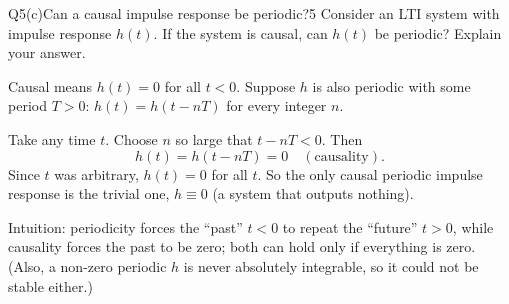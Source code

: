 \begin{qcard}{Q5(c)}{Can a causal impulse response be periodic?}{5}
Consider an LTI system with impulse response $h(t)$. If the system is causal, can $h(t)$ be periodic? Explain your answer.
\end{qcard}
\begin{solution}
Causal means $h(t)=0$ for all $t<0$. Suppose $h$ is also periodic with some period $T>0$: $h(t)=h(t-nT)$ for every integer $n$.

Take any time $t$. Choose $n$ so large that $t-nT<0$. Then
\[h(t)=h(t-nT)=0\quad(\text{causality}).\]
Since $t$ was arbitrary, $h(t)=0$ for all $t$. So the only causal periodic impulse response is the trivial one, $h\equiv0$ (a system that outputs nothing).

Intuition: periodicity forces the ``past'' $t<0$ to repeat the ``future'' $t>0$, while causality forces the past to be zero; both can hold only if everything is zero. (Also, a non-zero periodic $h$ is never absolutely integrable, so it could not be stable either.)
\end{solution}

